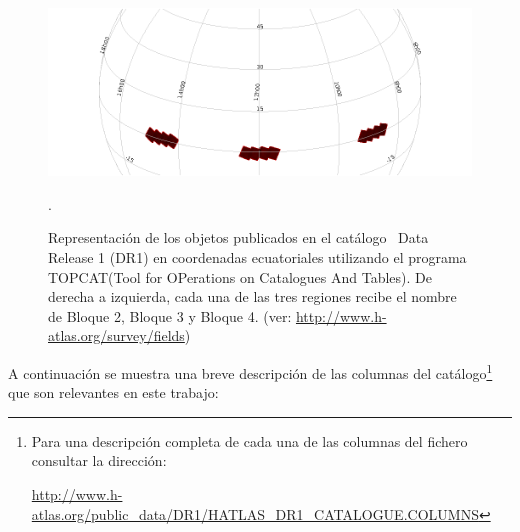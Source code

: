 \begin{figure}[htb]
    \begin{center}
         \includegraphics[width=14cm]{2_Muestras/atlas.png}
    \end{center}
    
    \caption{\small Representación de los objetos publicados en el catálogo \hatlas\ Data Release 1 (DR1) en coordenadas ecuatoriales utilizando el programa TOPCAT\footnotemark (Tool for OPerations on Catalogues And Tables). De derecha a izquierda, cada una de las tres regiones recibe el nombre de Bloque 2, Bloque 3 y Bloque 4. (ver: \href{website:hatlas_fields}{http://www.h-atlas.org/survey/fields})}.
    \label{fig:TOPCAT_HATLAS}
\end{figure}

A continuación se muestra una breve descripción de las columnas del catálogo\footnote{Para una descripción completa de cada una de las columnas del fichero consultar la dirección:

\url{http://www.h-atlas.org/public_data/DR1/HATLAS_DR1_CATALOGUE.COLUMNS}} que son relevantes en este trabajo:

